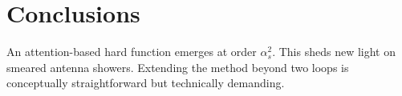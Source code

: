 \section{Conclusions}\label{sec:conclusions}

An attention-based hard function emerges at order $\alpha_s^2$. This
sheds new light on smeared antenna showers. Extending the method beyond
two loops is conceptually straightforward but technically demanding.

